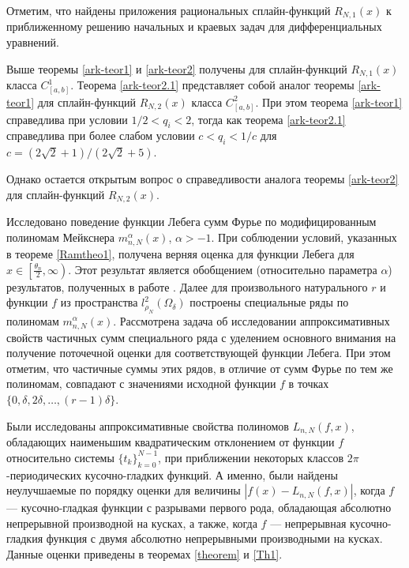 Отметим, что найдены приложения рациональных сплайн-функций $R_{N,1}(x)$ к  приближенному
решению начальных и краевых задач для дифференциальных уравнений.

Выше теоремы \ref{ark-teor1} и \ref{ark-teor2} получены для сплайн-функций $R_{N,1}(x)$ класса
$C^1_{[a,b]}$.
Теорема \ref{ark-teor2.1} представляет собой аналог теоремы \ref{ark-teor1} для сплайн-функций
$R_{N,2}(x)$ класса $C^2_{[a,b]}$. При этом теорема \ref{ark-teor1} справедлива
при условии $1/2<q_i<2$, тогда как теорема \ref{ark-teor2.1} справедлива при более
слабом условии $c<q_i<1/c$ для $c=(2\sqrt 2+1)/(2\sqrt 2+5)$.

Однако остается открытым вопрос о справедливости аналога теоремы  \ref{ark-teor2} для сплайн-функций
$R_{N,2}(x)$.

Исследовано поведение функции Лебега сумм Фурье по модифицированным полиномам Мейкснера $m_{n,N}^{\alpha}(x)$, $\alpha>-1$. При соблюдении условий, указанных в теореме \ref{Ramtheo1}, получена верняя оценка для функции Лебега для $x\in\left[\frac{\theta_n}{2}, \infty\right)$. Этот результат является обобщением (относительно параметра $\alpha$) результатов, полученных в работе \cite{Ram3}. Далее для произвольного натурального $r$  и функции $f$ из пространства $l_{\rho_N}^2(\Omega_\delta)$ построены специальные ряды по полиномам $m_{n,N}^{\alpha}(x)$. Рассмотрена задача об исследовании аппроксимативных свойств частичных сумм специального ряда с уделением основного внимания на получение поточечной оценки для соответствующей функции Лебега. При этом отметим, что частичные суммы этих рядов, в отличие от сумм Фурье по тем же полиномам, совпадают с значениями исходной функции $f$ в точках $\{0, \delta, 2\delta, \ldots, (r-1)\delta\}$.



Были исследованы аппроксимативные свойства полиномов $L_{n,N}(f,x)$, обладающих наименьшим квадратическим отклонением
от функции $f$ относительно системы $\{t_k\}_{k=0}^{N-1}$, при приближении некоторых классов  $2\pi$-периодических
кусочно-гладких функций. А именно, были найдены неулучшаемые по порядку оценки для величины $\left|f(x)-L_{n,N}(f,x)\right|$, когда
$f$ --- кусочно-гладкая функции с разрывами первого рода, обладающая абсолютно
непрерывной производной на кусках, а также, когда $f$ --- непрерывная кусочно-гладкия функция с двумя абсолютно непрерывными
производными на кусках. Данные оценки приведены в теоремах \ref{theorem} и \ref{Th1}.




